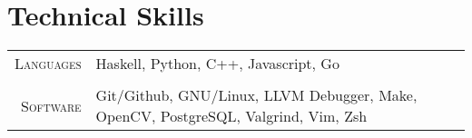 \documentclass[a4paper,10pt]{article}
\newcommand{\br}{\\\multicolumn{2}{c}{}}
\begin{document}
\section{Technical Skills}
\begin{tabular}{r|p{15cm}}
    \textsc{\small Languages} &
    Haskell,
    Python,
    C++,
    Javascript,
    Go\br\\

    \textsc{\small Software} &
    Git/Github,
    GNU/Linux,
    LLVM Debugger,
    Make,
    OpenCV,
    PostgreSQL,
    Valgrind,
    Vim,
    Zsh
\end{tabular}
\end{document}
